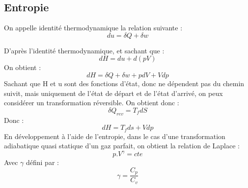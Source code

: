 \subsection{Entropie}
\begin{de}
On appelle identité thermodynamique la relation suivante :
$$du = \delta Q + \delta w$$
\end{de}
\begin{prop}
D'après l'identité thermodynamique, et sachant que : 
$$dH = du + d(pV)$$
On obtient : 
$$dH = \delta Q + \delta w + pdV+Vdp$$
Sachant que H et u sont des fonctions d'état, donc ne dépendent pas du chemin suivit, mais uniquement de l'état de départ et de l'état d'arrivé, on peux considérer un transformation réversible. On obtient donc :
$$\delta Q_{rev} = T_fdS$$
Donc :
$$dH = T_fds + Vdp$$
En développement à l'aide de l'entropie, dans le cas d'une transformation adiabatique quasi statique d'un gaz parfait,  on obtient la relation de Laplace : 
$$p.V^{\gamma} = cte$$
Avec $\gamma$ défini par : 
$$\gamma = \dfrac{C_p}{C_v}$$
\end{prop}
